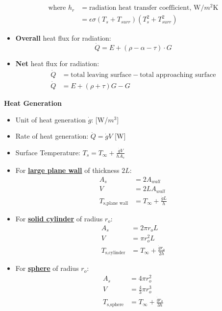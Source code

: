 \begin{itemize}
\begin{align*}
        \text{where } h_r &= \text{radiation heat transfer coefficient, W/$m^2$K}\\ 
        &=\epsilon \sigma (T_s + T_{surr})(T_s^2+T_{surr}^2)
    \end{align*}
    \item \textbf{\color{red}Overall\color{black}} heat flux for radiation:
    \begin{equation*}
        \dot{Q} = E + (\rho - \alpha - \tau) \cdot G
    \end{equation*}
    \item \textbf{\color{red}Net\color{black}} heat flux for radiation:
    \begin{align*}
        \dot{Q} &= \text{total leaving surface} - \text{total approaching surface} \\
        \dot{Q} &= E + (\rho+\tau ) G - G
    \end{align*}
\end{itemize}

\large\textbf{Heat Generation}
\begin{itemize}
    \item Unit of heat generation $\dot{g}$: [W/$m^3$]
    \item Rate of heat generation: $\dot{Q}=\dot{g}V$ [W]
    \item Surface Temperature: $T_s = T_{\infty}+\frac{\dot{g}V}{h A_s}$
    \item For \underline{\textbf{large plane wall}} of thickness $2L$:
    \begin{align*}
        A_s&=2A_{wall} \\
        V &=2LA_{wall} \\
        T_{\text{s,plane wall}} &= T_{\infty}+\frac{\dot{g}L}{h}
    \end{align*}
    \item For \underline{\textbf{solid cylinder}} of radius $r_o$:
    \begin{align*}
        A_s &= 2\pi r_o L \\
        V &=\pi r_o^2 L \\
        T_{\text{s,cylinder}} &= T_{\infty} + \frac{\dot{g}r_o}{2h}
    \end{align*}
    \item For \underline{\textbf{sphere}} of radius $r_o$:
    \begin{align*}
        A_s &= 4\pi r_o^2 \\
        V &= \frac{4}{3} \pi r_o^3 \\
        T_{\text{s,sphere}} &= T_{\infty} + \frac{\dot{g}r_o}{3h} 
    \end{align*}
\end{itemize}

